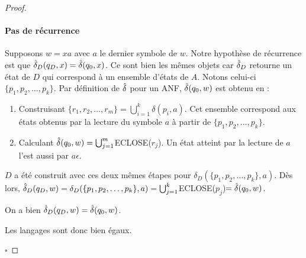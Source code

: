 \begin{proof}
	\paragraph{Pas de récurrence} Supposons $w=xa$ avec $a$ le dernier symbole de $w$. Notre hypothèse de récurrence est que $\hat{\delta}_D(q_D,x)=\hat{\delta}(q_0,x)$. Ce sont bien les mêmes objets car $\hat{\delta}_D$ retourne un état de $D$ qui correspond à un ensemble d'états de $A$. Notons celui-ci $\{p_1,p_2, \dots, p_k\}$. Par définition de $\hat{\delta}$ pour un ANF, $\hat{\delta}(q_0,w)$ est obtenu en :

	\begin{enumerate}
		\item Construisant $\{r_1,r_2,\dots, r_m\}=\bigcup_{i=1}^k \delta(p_i,a)$. Cet ensemble correspond aux états obtenus par la lecture du symbole $a$ à partir de $\{p_1,p_2,\dots,p_k\}$.
		\item Calculant $\hat{\delta}(q_0,w)=\bigcup_{j=1}^m$ECLOSE($r_j$). Un état atteint par la lecture de $a$ l'est aussi par $a\epsilon$.
	\end{enumerate}

	$D$ a été construit avec ces deux mêmes étapes pour $\delta_D(\{p_1,p_2,\dots, p_k\},a)$. Dès lors, $\hat{\delta}_D(q_D,w)=\delta_D(\{p_1,p_2,\dots, p_k\},a)=\bigcup_{j=1}^k$ECLOSE($p_j$)$=\hat{\delta}(q_0,w)$.

	On a bien $\hat{\delta}_D(q_D,w)=\hat{\delta}(q_0,w)$.

  Les langages sont donc bien égaux.

	\hfill$\square$
\end{proof}


